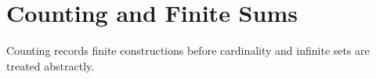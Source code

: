 \section{Counting and Finite Sums}

Counting records finite constructions before cardinality and infinite sets are treated abstractly.








